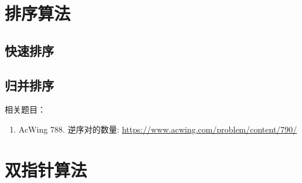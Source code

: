 \chapter{排序算法}

\begin{center}
\end{center}


\section{快速排序}



\section{归并排序}



\ifshowLink
相关题目：
    \begin{enumerate}
        \item AcWing 788. 逆序对的数量: \href{https://www.acwing.com/problem/content/790/}{https://www.acwing.com/problem/content/790/}
    \end{enumerate}
\fi

\chapter{双指针算法}